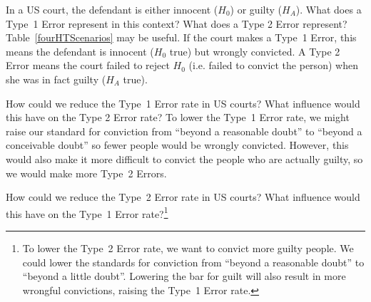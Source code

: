 \begin{example}{In a US court, the defendant is either innocent ($H_0$) or  guilty ($H_A$). What does a Type~1 Error represent in this context? What does a Type 2 Error represent? Table~\ref{fourHTScenarios} may be useful.}
If the court makes a Type~1 Error, this means the defendant is innocent ($H_0$ true) but wrongly convicted. A Type 2 Error means the court failed to reject $H_0$ (i.e. failed to convict the person) when she was in fact guilty ($H_A$ true).
\end{example}


\begin{example}{How could we reduce the Type~1 Error rate in US courts? What influence would this have on the Type 2 Error rate?}
To lower the Type~1 Error rate, we might raise our standard for conviction from ``beyond a reasonable doubt'' to ``beyond a conceivable doubt'' so fewer people would be wrongly convicted. However, this would also make it more difficult to convict the people who are actually guilty, so we would make more Type~2 Errors.
\end{example}

\begin{exercise} \label{howToReduceType2ErrorsInUSCourts}
How could we reduce the Type~2 Error rate in US courts? What influence would this have on the Type~1 Error rate?\footnote{To lower the Type~2 Error rate, we want to convict more guilty people. We could lower the standards for conviction from ``beyond a reasonable doubt'' to ``beyond a little doubt''. Lowering the bar for guilt will also result in more wrongful convictions, raising the Type~1 Error rate.}
\end{exercise}


